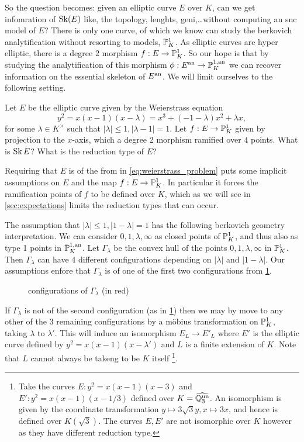 So the question becomes: given an elliptic curve $E$ over $K$, can we get infomration of $\operatorname{Sk}(E)$ like, the topology, lenghts, geni,\ldots without computing an snc model of  $E$?
There is only one curve, of which we know can study the berkovich analytification without resorting to models, $\mathbb{P}^{1}_K$.
As elliptic curves are hyper elliptic, there is a degree $2$ morphism $f: E \to \mathbb{P}^{1}_K$. 
So our hope is that by studying the analytification of this morphism $\phi: E{}^{\text{an}} \to \mathbb{P}^{1, \text{an}}_K$ we can recover information on the essential skeleton of $E{}^{\text{an}}$. 
We will limit ourselves to the following setting.
\begin{problem}\label{prob:main_problem}
	Let $E$ be the elliptic curve given by the Weierstrass equation 
	\begin{equation}\label{eq:weierstrass_problem}
		y^2 = x(x-1)(x-\lambda) = x^3 + (-1 - \lambda) x^2 + \lambda x
	,\end{equation}
	for some $\lambda \in K^\times $ such that $|\lambda| \le 1, |\lambda - 1| = 1$. 
	Let $f: E \to \mathbb{P}^{1}_K$ given by projection to the $x$-axis, which a degree 2 morphism ramified over $4$ points. 
	What is $\operatorname{Sk} E$? What is the reduction type of $E$?
\end{problem}

Requiring that $E$ is of the from in \eqref{eq:weierstrass_problem} puts some implicit assumptions on $E$ and the map $f: E \to \mathbb{P}^{1}_K$.
In particular it forces the ramification points of $f$ to be defined over $K$, which as we will see in \cref{sec:expectations} limits the reduction types that can occur. 

The assumption that $|\lambda| \le 1, |1 - \lambda| = 1$ has the following berkovich geometry interpretation.
We can consider $0, 1, \lambda, \infty$ as closed points of $\mathbb{P}^{1}_K$, and thus also as type 1 points in $\mathbb{P}^{1, \text{an}}_K$.
Let  $\Gamma_\lambda$ be the convex hull of the points $0, 1, \lambda, \infty$ in $\mathbb{P}^{1}_K$. 
Then  $\Gamma_\lambda$ can have 4 different configurations depending on $|\lambda|$ and $|1-\lambda|$. 
Our assumptions enfore that $\Gamma_\lambda$ is of one of the first two configurations from \cref{fig:configurations_of_gamma_lambda}.
\begin{figure}[ht]
    \centering
    \caption{configurations of $\Gamma_\lambda$ (in red)}
    \label{fig:configurations_of_gamma_lambda}
\end{figure}
If  $\Gamma_\lambda$ is not of the second configuration (as in \cref{fig:configurations_of_gamma_lambda}) then we may by move to any other of the 3 remaining configurations by a möbius transformation on $\mathbb{P}^{1}_K$, taking $\lambda$ to $\lambda'$. 
This will induce an isomorphism $E_L \to E'_L$ where $E'$ is the elliptic curve defined by $y^2 = x(x-1)(x-\lambda')$ and $L$ is a finite extension of $K$. 
Note  that $L$ cannot always be takeng to be $K$ itself
\footnote{Take the curves $E: y^2 = x(x -1)(x-3)$ and $E': y^2 = x(x-1)(x-1 /3)$ defined over $K = \widehat{\mathbb{Q}_3^{\text{un}}}$.
An isomorphism is given by the coordinate transformation $y\mapsto 3\sqrt{3} y, x\mapsto 3x$, and hence is defined over $K(\sqrt{3} )$. The curves $E, E'$ are not isomorphic over $K$ however as they have different reduction type.}.













